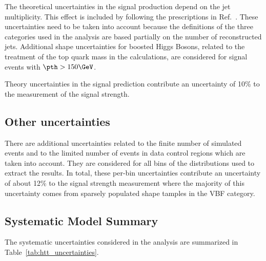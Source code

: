 The theoretical uncertainties in the signal production depend on the jet multiplicity. This effect is included 
by following the prescriptions in Ref.~\cite{Stewart:2011cf}. These uncertainties need to be taken into account because 
the definitions of the three categories used in the analysis are based partially on the number of reconstructed 
jets. Additional shape uncertainties for boosted Higgs Bosons, related to the treatment of the top quark mass in 
the calculations, are considered for signal events with $\pth>150\GeV$.

Theory uncertainties in the signal prediction contribute an uncertainty of 10\% to the measurement of the signal strength.


\subsection{Other uncertainties}
There are additional uncertainties related to the finite number of simulated events and to the limited number 
of events in data control regions which are taken into account. They are considered for all bins of the 
distributions used to extract the results. In total, these per-bin uncertainties contribute an uncertainty of 
about 12\% to the signal strength measurement where the majority of this uncertainty comes from sparsely populated 
shape tamples in the VBF category.


\subsection{Systematic Model Summary}
The systematic uncertainties considered in the analysis are summarized in Table~\ref{tab:htt_uncertainties}.

